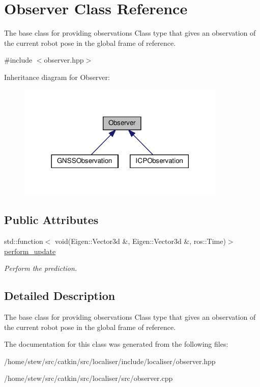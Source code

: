 \hypertarget{classObserver}{}\section{Observer Class Reference}
\label{classObserver}


The base class for providing observations Class type that gives an observation of the current robot pose in the global frame of reference.  




{\ttfamily \#include $<$observer.\+hpp$>$}



Inheritance diagram for Observer\+:
\nopagebreak
\begin{figure}[H]
\begin{center}
\leavevmode
\includegraphics[width=282pt]{classObserver__inherit__graph}
\end{center}
\end{figure}
\subsection*{Public Attributes}
\begin{DoxyCompactItemize}
\item 
\mbox{\label{classObserver_acfc1e4a0a7bbd59ccd2da9fda03a2c7e}} 
std\+::function$<$ void(Eigen\+::\+Vector3d \&, Eigen\+::\+Vector3d \&, ros\+::\+Time)$>$ \hyperlink{classObserver_acfc1e4a0a7bbd59ccd2da9fda03a2c7e}{perform\+\_\+update}
\begin{DoxyCompactList}\small\item\em Perform the prediction. \end{DoxyCompactList}\end{DoxyCompactItemize}


\subsection{Detailed Description}
The base class for providing observations Class type that gives an observation of the current robot pose in the global frame of reference. 

The documentation for this class was generated from the following files\+:\begin{DoxyCompactItemize}
\item 
/home/stew/src/catkin/src/localiser/include/localiser/observer.\+hpp\item 
/home/stew/src/catkin/src/localiser/src/observer.\+cpp\end{DoxyCompactItemize}
